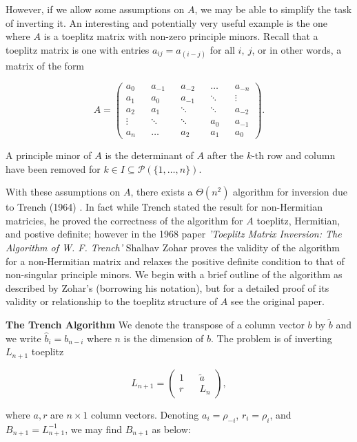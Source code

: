 \documentclass{article}
\begin{document}
However, if we allow some assumptions on $A$, we may be able to simplify the task of inverting it. An interesting and potentially very useful example is the one where $A$ is a toeplitz matrix with non-zero principle minors. Recall that a toeplitz matrix is one with entries $ a_{ij} = a_{(i-j)}$ for all $i, \: j$, or in other words, a matrix of the form

$$ A = \begin{pmatrix} a_0 && a_{-1} && a_{-2} && \ldots && a_{-n} \\
a_{1} && a_0 && a_{-1} && \ddots && \vdots \\
a_{2} && a_{1} && \ddots && \ddots && a_{-2} \\
\vdots && \ddots  && \ddots && a_{0} && a_{-1} \\
a_{n} && \ldots && a_{2} && a_1 && a_0
\end{pmatrix}.$$

A principle minor of $A$ is the determinant of $A$ after the $k$-th row and column have been removed for $k \in I \subseteq \mathcal{P}\left(\{1, \ldots, n\} \right)$.

With these assumptions on $A$, there exists a $\Theta(n^2)$ algorithm for inversion due to Trench (1964) \autocite{Trench}. In fact while Trench stated the result for non-Hermitian matricies, he proved the correctness of the algorithm for $A$ toeplitz, Hermitian, and postive definite; however in the 1968 paper \textit{'Toeplitz Matrix Inversion: The Algorithm of W. F. Trench'} Shalhav Zohar proves the validity of the algorithm for a non-Hermitian matrix and relaxes the positive definite condition to that of non-singular principle minors. \autocite{Zohar} We begin with a brief outline of the algorithm as described by Zohar's (borrowing his notation), but for a detailed proof of its validity or relationship to the toeplitz structure of $A$ see the original paper.

\textbf{The Trench Algorithm}
We denote the transpose of a column vector $b$ by $\tilde{b}$ and we write $\hat{b}_i = b_{n-i}$ where $n$ is the dimension of $b$. The problem is of inverting $L_{n+1}$ toeplitz

$$ L_{n+1} = \begin{pmatrix} 1 && \tilde{a} \\
 r && L_n \end{pmatrix},$$

 where $a, r$ are $n \times 1$ column vectors. Denoting $a_i = \rho_{-i}$, $r_i = \rho_i$, and $B_{n+1} = L_{n+1}^{-1}$, we may find $B_{n+1}$ as below:
\end{document}
